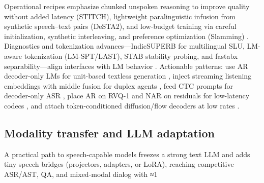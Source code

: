 \documentclass{article}
\begin{document}
Operational recipes emphasize chunked unspoken reasoning to improve quality without added latency (STITCH), lightweight paralinguistic infusion from synthetic speech–text pairs (DeSTA2), and low-budget training via careful initialization, synthetic interleaving, and preference optimization (Slamming) \cite{chiang2025stitchsimultaneousthinkingtalkingchunked,lu2025desta2developinginstructionfollowingspee,maimon2025slammingtrainingspeechlanguagemodelonegp}. Diagnostics and tokenization advances—IndicSUPERB for multilingual SLU, LM-aware tokenization (LM-SPT/LAST), STAB stability probing, and fastabx separability—align interfaces with LM behavior \cite{entry2025indicsuperbspeechprocessinguniversalperf,jo2025lmsptalignedsemanticdistillationspeechto,turetzky2024lastlanguagemodelawarespeechtokenization,vashishth2024stabspeechtokenizerassessmentbenchmark,poli2025fastabxlibraryefficientcomputationabxdis}. Actionable patterns: use AR decoder-only LMs for unit-based textless generation \cite{nakata2024jchatjapaneselargescalespokendialoguecor}, inject streaming listening embeddings with middle fusion for duplex agents \cite{ma2024languagemodelcanlistenwhilespeaking}, feed CTC prompts for decoder-only ASR \cite{tsunoo2024decoderonlyarchitecturespeechrecognition}, place AR on RVQ-1 and NAR on residuals for low-latency codecs \cite{min2025speechretrievalaugmentedgenerationwithou,li2024investigatingneuralaudiocodecsspeechlang}, and attach token-conditioned diffusion/flow decoders at low rates \cite{yang2025diffsoundstreamefficientspeechtokenizati,jo2025lmsptalignedsemanticdistillationspeechto,vashishth2024stabspeechtokenizerassessmentbenchmark}.

\subsection{Modality transfer and LLM adaptation} \label{subsec:Modality transfer and LLM adaptation}
A practical path to speech-capable models freezes a strong text LLM and adds tiny speech bridges (projectors, adapters, or LoRA), reaching competitive ASR/AST, QA, and mixed-modal dialog with ≈1%
\end{document}
